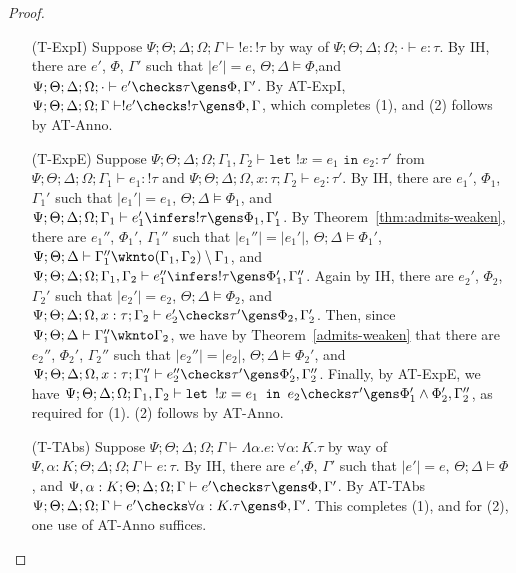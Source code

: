 \begin{proof}
\begin{itemize}
  \item[(T-ExpI)] Suppose
  $\Psi ; \Theta ; \Delta ; \Omega ; \Gamma \vdash !e : !\tau$ by way of
  $\Psi ; \Theta ; \Delta ; \Omega ; \cdot \vdash e : \tau$.
  By IH, there are $e'$, $\Phi$, $\Gamma'$ such that
  $|e'| = e$,
  $\Theta ; \Delta \vDash \Phi$,and
  $\Psi ; \Theta ; \Delta ; \Omega; \cdot \vdash e' \checks \tau \gens \Phi,\Gamma'$.
  By AT-ExpI,
  $\Psi ; \Theta ; \Delta ; \Omega; \Gamma \vdash !e' \checks !\tau \gens \Phi,\Gamma$,
  which completes (1), and (2) follows by AT-Anno.        
  
  \item[(T-ExpE)] Suppose
  $\Psi ; \Theta ; \Delta ; \Omega ; \Gamma_1,\Gamma_2 \vdash \texttt{let } !x = e_1 \texttt{ in } e_2 : \tau'$ from
  $\Psi ; \Theta ; \Delta ; \Omega ; \Gamma_1 \vdash e_1  : !\tau$ and
  $\Psi ; \Theta ; \Delta ; \Omega, x : \tau ; \Gamma_2 \vdash e_2 : \tau'$.
  By IH, there are $e_1'$, $\Phi_1$, $\Gamma_1'$ such that
  $|e_1'| = e_1$,
  $\Theta ; \Delta \vDash \Phi_1$, and
  $\Psi ; \Theta ; \Delta ; \Omega ; \Gamma_1 \vdash e_1' \infers !\tau \gens \Phi_1,\Gamma_1'$.
  By Theorem~\ref{thm:admits-weaken}, there are $e_1''$, $\Phi_1'$, $\Gamma_1''$ such that
  $|e_1''| = |e_1'|$,
  $\Theta ; \Delta \vDash \Phi_1'$,
  $\Psi ; \Theta ; \Delta \vdash \Gamma_1'' \wknto (\Gamma_1,\Gamma_2) \setminus \Gamma_1$, and
  $\Psi ; \Theta ; \Delta ; \Omega; \Gamma_1,\Gamma_2 \vdash e_1'' \infers !\tau \gens \Phi_1',\Gamma_1''$.
  Again by IH, there are $e_2'$, $\Phi_2$, $\Gamma_2'$ such that
  $|e_2'| = e_2$,
  $\Theta ; \Delta \vDash \Phi_2$, and
  $\Psi ; \Theta ; \Delta ; \Omega, x: \tau ; \Gamma_2 \vdash e_2' \checks \tau' \gens \Phi_2,\Gamma_2'$.
  Then, since
  $\Psi ; \Theta ; \Delta \vdash \Gamma_1'' \wknto \Gamma_2$,
  we have by Theorem~\ref{admits-weaken} that there are $e_2''$, $\Phi_2'$, $\Gamma_2''$ such that
  $|e_2''| = |e_2|$,
  $\Theta ; \Delta \vDash \Phi_2'$, and
  $\Psi ; \Theta ; \Delta ; \Omega, x : \tau ; \Gamma_1'' \vdash e_2'' \checks \tau' \gens \Phi_2', \Gamma_2''$.
  Finally, by AT-ExpE, we have
  $\Psi ; \Theta ; \Delta ; \Omega ; \Gamma_1,\Gamma_2 \vdash \texttt{let } !x = e_1 \texttt{ in } e_2 \checks \tau' \gens \Phi_1' \wedge \Phi_2', \Gamma_2''$,
  as required for (1). (2) follows by AT-Anno.
  
  \item[(T-TAbs)] Suppose
  $\Psi ; \Theta ; \Delta ; \Omega ; \Gamma \vdash \Lambda \alpha. e : \forall \alpha : K.\tau$ by way of
  $\Psi, \alpha : K ; \Theta ; \Delta ; \Omega ; \Gamma \vdash e : \tau$.
  By IH, there are $e'$,$\Phi$, $\Gamma'$ such that
  $|e'| = e$,
  $\Theta ; \Delta \vDash \Phi$, and
  $\Psi, \alpha : K ; \Theta ; \Delta ; \Omega ; \Gamma \vdash e' \checks \tau \gens \Phi,\Gamma'$.
  By AT-TAbs
  $\Psi ; \Theta ; \Delta ; \Omega ; \Gamma \vdash e' \checks \forall \alpha : K. \tau \gens \Phi,\Gamma'$.
  This completes (1), and for (2), one use of AT-Anno suffices.
    

\end{itemize}
\end{proof}
